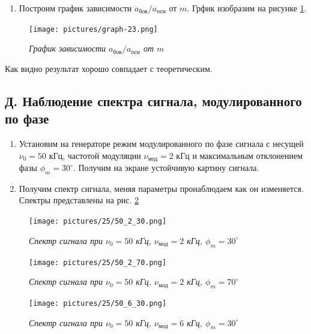 \documentclass[a4paper,12pt]{article}
\begin{document}
\begin{enumerate}[resume]
    \item Построим график зависимости $a_\text{бок}/a_\text{осн}$ от $m$. Грфик изобразим на рисунке \ref{graph:3}.
\end{enumerate}

\FloatBarrier
\begin{figure}[!ht]
        \centering
	\texttt{[image: pictures/graph-23.png]}
	\caption{\textit{График зависимости $a_\text{бок}/a_\text{осн}$ от $m$}}
	\label{graph:3}
\end{figure}
\FloatBarrier

Как видно результат хорошо совпадает с теоретическим.

\subsection{Д. Наблюдение спектра сигнала, модулированного по фазе}

\begin{enumerate}[resume]
    \item Установим на генераторе режим модулированного по фазе сигнала с несущей $\nu_0 = 50$ кГц, частотой модуляции $\nu_\text{мод} = 2$ кГц и максимальным отклонением фазы $\phi_m = 30^\circ$. Получим на экране устойчивую картину сигнала.
    \item Получим спектр сигнала, меняя параметры пронаблюдаем как он изменяется. Спектры представлены на рис. \ref{pic:phase-1}
\end{enumerate}

\FloatBarrier
\begin{figure}[!ht]
        \centering
	\texttt{[image: pictures/25/50\_2\_30.png]}
	\caption{\textit{Спектр сигнала при $\nu_0 = 50$ кГц, $\nu_\text{мод} = 2$ кГц, $\phi_m = 30^\circ$}}
	\label{pic:phase-1}
\end{figure}

\begin{figure}[!ht]
        \centering
	\texttt{[image: pictures/25/50\_2\_70.png]}
	\caption{\textit{Спектр сигнала при $\nu_0 = 50$ кГц, $\nu_\text{мод} = 2$ кГц, $\phi_m = 70^\circ$}}
	\label{pic:phase-2}
\end{figure}

\begin{figure}[!ht]
        \centering
	\texttt{[image: pictures/25/50\_6\_30.png]}
	\caption{\textit{Спектр сигнала при $\nu_0 = 50$ кГц, $\nu_\text{мод} = 6$ кГц, $\phi_m = 30^\circ$}}
	\label{pic:phase-3}
\end{figure}
\FloatBarrier
\end{document}

